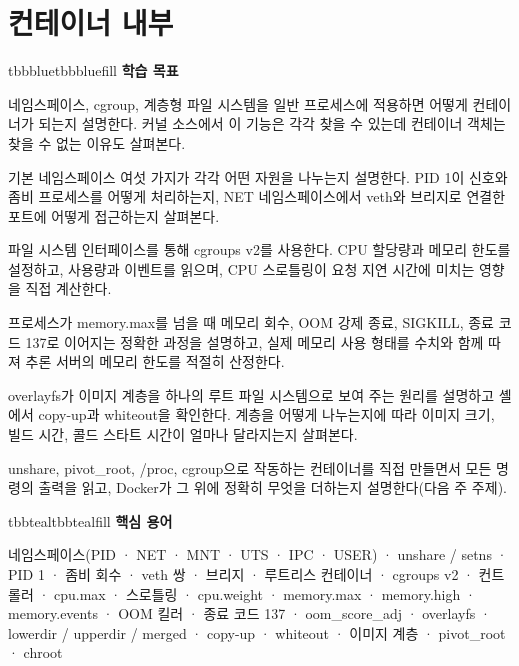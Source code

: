 \setcounter{chapter}{2}
\chapter{컨테이너 내부}

\begin{calloutbox}{tbbblue}{tbbbluefill}
{\normalsize\bfseries\color{tbbblue}학습 목표}\par\vspace{3pt}
\begin{tbbitemize}
  \item 네임스페이스, cgroup, 계층형 파일 시스템을 일반 프로세스에 적용하면 어떻게 컨테이너가 되는지 설명한다. 커널 소스에서 이 기능은 각각 찾을 수 있는데 컨테이너 객체는 찾을 수 없는 이유도 살펴본다.
  \item 기본 네임스페이스 여섯 가지가 각각 어떤 자원을 나누는지 설명한다. PID 1이 신호와 좀비 프로세스를 어떻게 처리하는지, NET 네임스페이스에서 veth와 브리지로 연결한 포트에 어떻게 접근하는지 살펴본다.
  \item 파일 시스템 인터페이스를 통해 cgroups v2를 사용한다. CPU 할당량과 메모리 한도를 설정하고, 사용량과 이벤트를 읽으며, CPU 스로틀링이 요청 지연 시간에 미치는 영향을 직접 계산한다.
  \item 프로세스가 memory.max를 넘을 때 메모리 회수, OOM 강제 종료, SIGKILL, 종료 코드 137로 이어지는 정확한 과정을 설명하고, 실제 메모리 사용 형태를 수치와 함께 따져 추론 서버의 메모리 한도를 적절히 산정한다.
  \item overlayfs가 이미지 계층을 하나의 루트 파일 시스템으로 보여 주는 원리를 설명하고 셸에서 copy-up과 whiteout을 확인한다. 계층을 어떻게 나누는지에 따라 이미지 크기, 빌드 시간, 콜드 스타트 시간이 얼마나 달라지는지 살펴본다.
  \item unshare, pivot\_root, /proc, cgroup으로 작동하는 컨테이너를 직접 만들면서 모든 명령의 출력을 읽고, Docker가 그 위에 정확히 무엇을 더하는지 설명한다(다음 주 주제).
\end{tbbitemize}
\end{calloutbox}

\vspace{5.0pt}

\begin{calloutbox}{tbbteal}{tbbtealfill}
{\normalsize\bfseries\color{tbbteal}핵심 용어}\par\vspace{3pt}
네임스페이스(PID · NET · MNT · UTS · IPC · USER) · unshare / setns · PID 1 · 좀비 회수 · veth 쌍 · 브리지 · 루트리스 컨테이너 · cgroups v2 · 컨트롤러 · cpu.max · 스로틀링 · cpu.weight · memory.max · memory.high · memory.events · OOM 킬러 · 종료 코드 137 · oom\_score\_adj · overlayfs · lowerdir / upperdir / merged · copy-up · whiteout · 이미지 계층 · pivot\_root · chroot
\end{calloutbox}

